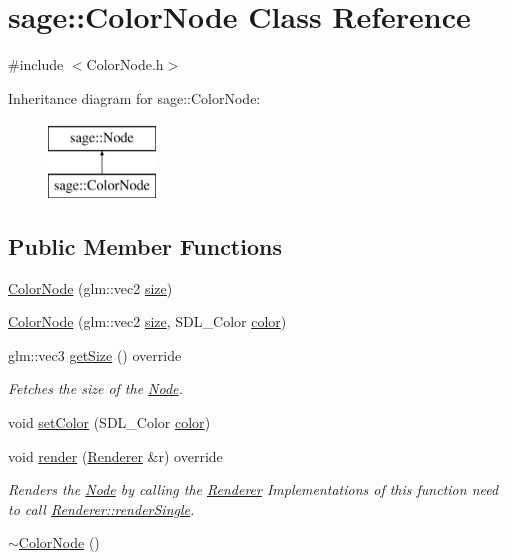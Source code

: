 \hypertarget{classsage_1_1ColorNode}{}\section{sage\+::Color\+Node Class Reference}
\label{classsage_1_1ColorNode}


{\ttfamily \#include $<$Color\+Node.\+h$>$}

Inheritance diagram for sage\+::Color\+Node\+:\begin{figure}[H]
\begin{center}
\leavevmode
\includegraphics[height=2.000000cm]{classsage_1_1ColorNode}
\end{center}
\end{figure}
\subsection*{Public Member Functions}
\begin{DoxyCompactItemize}
\item 
\mbox{\hyperlink{classsage_1_1ColorNode_a2a7235f477d542f28f6bbf1bda63176a}{Color\+Node}} (glm\+::vec2 \mbox{\hyperlink{classsage_1_1ColorNode_a04b687374b9c171ff820c514f15b0ae0}{size}})
\item 
\mbox{\hyperlink{classsage_1_1ColorNode_a104606b1c60c8956f2ab205ce26c9577}{Color\+Node}} (glm\+::vec2 \mbox{\hyperlink{classsage_1_1ColorNode_a04b687374b9c171ff820c514f15b0ae0}{size}}, S\+D\+L\+\_\+\+Color \mbox{\hyperlink{classsage_1_1ColorNode_aad5832e161e608730df9512894725d2d}{color}})
\item 
glm\+::vec3 \mbox{\hyperlink{classsage_1_1ColorNode_ad2ffce290e2cde1697ae609fe0a7b68c}{get\+Size}} () override
\begin{DoxyCompactList}\small\item\em Fetches the size of the \mbox{\hyperlink{classsage_1_1Node}{Node}}. \end{DoxyCompactList}\item 
void \mbox{\hyperlink{classsage_1_1ColorNode_a65747783aeea07d997c54b3ef8d212f8}{set\+Color}} (S\+D\+L\+\_\+\+Color \mbox{\hyperlink{classsage_1_1ColorNode_aad5832e161e608730df9512894725d2d}{color}})
\item 
void \mbox{\hyperlink{classsage_1_1ColorNode_ac2cf18feb8ab4e55dd68ca8b0c4faabf}{render}} (\mbox{\hyperlink{classsage_1_1Renderer}{Renderer}} \&r) override
\begin{DoxyCompactList}\small\item\em Renders the \mbox{\hyperlink{classsage_1_1Node}{Node}} by calling the \mbox{\hyperlink{classsage_1_1Renderer}{Renderer}} Implementations of this function need to call \mbox{\hyperlink{classsage_1_1Renderer_aa79cfd587fa85ae8ea7ccf465825d212}{Renderer\+::render\+Single}}. \end{DoxyCompactList}\item 
\mbox{\hyperlink{classsage_1_1ColorNode_af1864690840922c8b14340d6991eac3e}{$\sim$\+Color\+Node}} ()
\end{DoxyCompactItemize}
